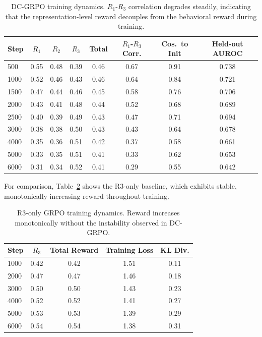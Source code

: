 \documentclass[11pt,a4paper]{article}
\begin{document}
\begin{table}[h]
\centering
\caption{DC-GRPO training dynamics. $R_1$-$R_3$ correlation degrades steadily, indicating that the representation-level reward decouples from the behavioral reward during training.}
\label{tab:training_dynamics}
\small
\begin{tabular}{lccccccc}
\toprule
Step & $R_1$ & $R_2$ & $R_3$ & Total & $R_1$-$R_3$ Corr. & Cos.\ to Init & Held-out AUROC \\
\midrule
500  & 0.55 & 0.48 & 0.39 & 0.46 & 0.67 & 0.91 & 0.738 \\
1000 & 0.52 & 0.46 & 0.43 & 0.46 & 0.64 & 0.84 & 0.721 \\
1500 & 0.47 & 0.44 & 0.46 & 0.45 & 0.58 & 0.76 & 0.706 \\
2000 & 0.43 & 0.41 & 0.48 & 0.44 & 0.52 & 0.68 & 0.689 \\
2500 & 0.40 & 0.39 & 0.49 & 0.43 & 0.47 & 0.71 & 0.694 \\
3000 & 0.38 & 0.38 & 0.50 & 0.43 & 0.43 & 0.64 & 0.678 \\
4000 & 0.35 & 0.36 & 0.51 & 0.42 & 0.37 & 0.58 & 0.661 \\
5000 & 0.33 & 0.35 & 0.51 & 0.41 & 0.33 & 0.62 & 0.653 \\
6000 & 0.31 & 0.34 & 0.52 & 0.41 & 0.29 & 0.55 & 0.642 \\
\bottomrule
\end{tabular}
\end{table}

For comparison, Table~\ref{tab:r3only_dynamics} shows the R3-only baseline, which exhibits stable, monotonically increasing reward throughout training.

\begin{table}[h]
\centering
\caption{R3-only GRPO training dynamics. Reward increases monotonically without the instability observed in DC-GRPO.}
\label{tab:r3only_dynamics}
\small
\begin{tabular}{lcccc}
\toprule
Step & $R_3$ & Total Reward & Training Loss & KL Div. \\
\midrule
1000 & 0.42 & 0.42 & 1.51 & 0.11 \\
2000 & 0.47 & 0.47 & 1.46 & 0.18 \\
3000 & 0.50 & 0.50 & 1.43 & 0.23 \\
4000 & 0.52 & 0.52 & 1.41 & 0.27 \\
5000 & 0.53 & 0.53 & 1.39 & 0.29 \\
6000 & 0.54 & 0.54 & 1.38 & 0.31 \\
\bottomrule
\end{tabular}
\end{table}
\end{document}
